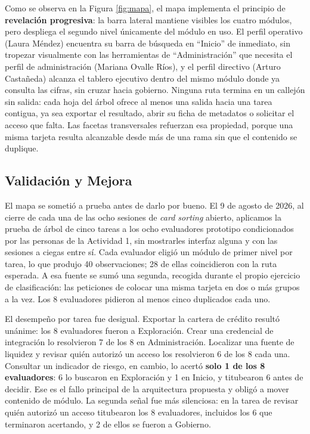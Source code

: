 
Como se observa en la Figura \ref{fig:mapa}, el mapa implementa el principio de \textbf{revelación progresiva}: la barra lateral mantiene visibles los cuatro módulos, pero despliega el segundo nivel únicamente del módulo en uso. El perfil operativo (Laura Méndez) encuentra su barra de búsqueda en ``Inicio'' de inmediato, sin tropezar visualmente con las herramientas de ``Administración'' que necesita el perfil de administración (Mariana Ovalle Ríos), y el perfil directivo (Arturo Castañeda) alcanza el tablero ejecutivo dentro del mismo módulo donde ya consulta las cifras, sin cruzar hacia gobierno. Ninguna ruta termina en un callejón sin salida: cada hoja del árbol ofrece al menos una salida hacia una tarea contigua, ya sea exportar el resultado, abrir su ficha de metadatos o solicitar el acceso que falta. Las facetas transversales refuerzan esa propiedad, porque una misma tarjeta resulta alcanzable desde más de una rama sin que el contenido se duplique.

\subsection{Validación y Mejora}
El mapa se sometió a prueba antes de darlo por bueno. El 9 de agosto de 2026, al cierre de cada una de las ocho sesiones de \textit{card sorting} abierto, aplicamos la prueba de árbol de cinco tareas a los ocho evaluadores prototipo condicionados por las personas de la Actividad 1, sin mostrarles interfaz alguna y con las sesiones a ciegas entre sí. Cada evaluador eligió un módulo de primer nivel por tarea, lo que produjo 40 observaciones; 28 de ellas coincidieron con la ruta esperada. A esa fuente se sumó una segunda, recogida durante el propio ejercicio de clasificación: las peticiones de colocar una misma tarjeta en dos o más grupos a la vez. Los 8 evaluadores pidieron al menos cinco duplicados cada uno.

El desempeño por tarea fue desigual. Exportar la cartera de crédito resultó unánime: los 8 evaluadores fueron a Exploración. Crear una credencial de integración lo resolvieron 7 de los 8 en Administración. Localizar una fuente de liquidez y revisar quién autorizó un acceso los resolvieron 6 de los 8 cada una. Consultar un indicador de riesgo, en cambio, lo acertó \textbf{solo 1 de los 8 evaluadores}: 6 lo buscaron en Exploración y 1 en Inicio, y titubearon 6 antes de decidir. Ese es el fallo principal de la arquitectura propuesta y obligó a mover contenido de módulo. La segunda señal fue más silenciosa: en la tarea de revisar quién autorizó un acceso titubearon los 8 evaluadores, incluidos los 6 que terminaron acertando, y 2 de ellos se fueron a Gobierno.

